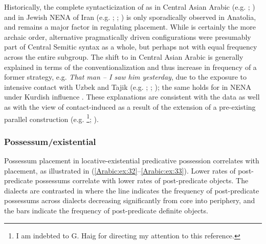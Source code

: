 \documentclass[output=paper,colorlinks,citecolor=brown,draftmode]{langscibook}
\begin{document}
Historically, the complete syntacticization of  as in Central Asian Arabic (e.g. \citealt{Seeger2002AChorasan}; \citealt{Jastrow2004UzbekA}) and in Jewish NENA of Iran (e.g. \citealt{Khan2020ContactChange}; \citealt{NoorlanderMolin2022WordOrder}; ) is only sporadically observed in Anatolia, and  remains a major factor in regulating  placement. While  is certainly the more archaic order, alternative pragmatically driven configurations were presumably part of Central Semitic syntax as a whole, but perhaps not with equal frequency across the entire subgroup. The shift to  in Central Asian Arabic is generally explained in terms of the conventionalization and thus increase in frequency of a former  strategy, e.g. \textit{That man -- I saw him yesterday}, due to the exposure to intensive contact  with Uzbek and Tajik (e.g. \citealt[452]{Versteegh1984UzbekA}; \citealt{Ratcliffe2004BukharaA}; \citealt[56]{Souag2017CDoubling}); the same holds for  in NENA under Kurdish influence \citep[410–412]{haig_verb-goal_2015}. These explanations are consistent with the data as well as with the view of contact-induced   as a result of the extension of a pre-existing parallel construction (e.g. \citealt{Silva-Corvalan1994ContactChange,Silva-Corvalan2008Limits}\footnote{I am indebted to G. Haig for directing my attention to this reference.}; \citealt{Heine2008contact}).

\subsubsection{Possessum/existential}

\begin{sloppypar}
Possessum placement in locative-existential predicative possession correlates with  placement, as illustrated in (\ref{Arabic:ex:32}--\ref{Arabic:ex:33}). Lower rates of post-predicate possessums correlate with lower rates of post-predicate objects. The dialects are contrasted in  where the line indicates the frequency of post-predicate possessums across dialects decreasing significantly from core into periphery, and the bars indicate the frequency of post-predicate definite objects.
\end{sloppypar}
\end{document}
